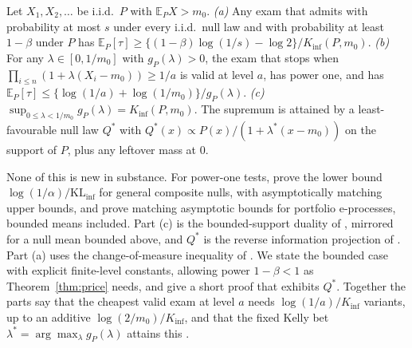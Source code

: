 \begin{proposition}\label{thm:onexam}
Let $X_1,X_2,\dots$ be i.i.d.\ $P$ with $\mathbb E_PX>m_0$.
\emph{(a)} Any exam that admits with probability at most $s$ under every i.i.d.\ null law and with probability at least $1-\beta$ under $P$ has $\mathbb E_P[\tau]\ge\{(1-\beta)\log(1/s)-\log2\}/K_{\inf}(P,m_0)$.
\emph{(b)} For any $\lambda\in[0,1/m_0]$ with $g_P(\lambda)>0$, the exam that stops when $\prod_{i\le n}(1+\lambda(X_i-m_0))\ge1/a$ is valid at level $a$, has power one, and has $\mathbb E_P[\tau]\le\{\log(1/a)+\log(1/m_0)\}/g_P(\lambda)$.
\emph{(c)} $\sup_{0\le\lambda<1/m_0}g_P(\lambda)=K_{\inf}(P,m_0)$. The supremum is attained by a least-favourable null law $Q^*$ with $Q^*(x)\propto P(x)/(1+\lambda^*(x-m_0))$ on the support of $P$, plus any leftover mass at $0$.
\end{proposition}
None of this is new in substance. For power-one tests, \citet[Theorem~3.1]{agrawal2025stopping} prove the lower bound $\log(1/\alpha)/\mathrm{KL}_{\inf}$ for general composite nulls, with asymptotically matching upper bounds, and \citet{waudbysmith2025instance} prove matching asymptotic bounds for portfolio e-processes, bounded means included. Part (c) is the bounded-support duality of \citet{honda2010asymptotically} \citep[see also][Proposition~1]{honda2015nonasymptotic}, mirrored for a null mean bounded above, and $Q^*$ is the reverse information projection of \citet{larsson2025numeraire}. Part (a) uses the change-of-measure inequality of \citet[Lemma~1]{kaufmann2016complexity} \citep[see also][]{garivier2019explore}. We state the bounded case with explicit finite-level constants, allowing power $1-\beta<1$ as Theorem~\ref{thm:price} needs, and give a short proof that exhibits $Q^*$. Together the parts say that the cheapest valid exam at level $a$ needs $\log(1/a)/K_{\inf}$ variants, up to an additive $\log(2/m_0)/K_{\inf}$, and that the fixed Kelly bet $\lambda^*=\arg\max_\lambda g_P(\lambda)$ attains this \citep[compare][]{grunwald2024safe,shekhar2024nonparametric}.

